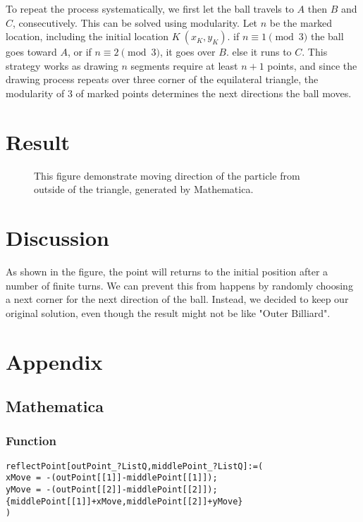 \documentclass[a4paper,11pt, a4paper]{article}
\begin{document}
To repeat the process systematically, we first let the ball travels to \(A\) then \(B\) and \(C\), consecutively. This can be solved using modularity. Let \(n\) be the marked location, including the initial location \(K \ (x_K, y_K)\). if \(n \equiv 1 \pmod 3\) the ball goes toward \(A\), or if \(n \equiv 2 \pmod 3\), it goes over \(B\). else it runs to \(C\). This strategy works as drawing \(n\) segments require at least \(n+1\) points, and since the drawing process repeats over three corner of the equilateral triangle, the modularity of 3 of marked points determines the next directions the ball moves.

\section{Result}
\begin{figure}
\centering
{}
\caption{This figure demonstrate moving direction of the particle from outside of the triangle, generated by Mathematica.}
\end{figure}

\section{Discussion}
As shown in the figure, the point will returns to the initial position after a number of finite turns. We can prevent this from happens by randomly choosing a next corner for the next direction of the ball. Instead, we decided to keep our original solution, even though the result might not be like "Outer Billiard".

\pagebreak
\section{Appendix}
\subsection{Mathematica}
\subsubsection{Function}
\lstset{language=Mathematica}
\begin{lstlisting}
reflectPoint[outPoint_?ListQ,middlePoint_?ListQ]:=(
xMove = -(outPoint[[1]]-middlePoint[[1]]);
yMove = -(outPoint[[2]]-middlePoint[[2]]);
{middlePoint[[1]]+xMove,middlePoint[[2]]+yMove}
)
\end{lstlisting}
\end{document}
